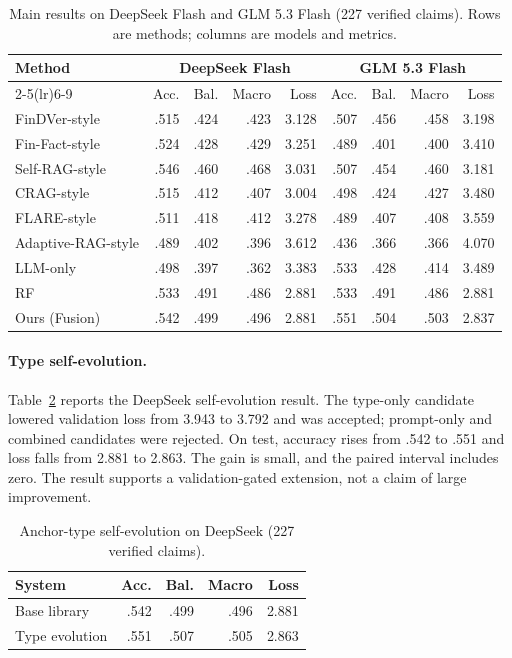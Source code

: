 \documentclass[11pt]{article}
\begin{document}
\begin{table}[t]
\centering
\small
\setlength{\tabcolsep}{6pt}
\caption{Main results on DeepSeek Flash and GLM 5.3 Flash (227 verified claims). Rows are methods; columns are models and metrics.}
\label{tab:main}
\begin{tabular}{lrrrrrrrr}
\toprule
\multirow{2}{*}{Method} & \multicolumn{4}{c}{DeepSeek Flash} & \multicolumn{4}{c}{GLM 5.3 Flash} \\
\cmidrule(lr){2-5}\cmidrule(lr){6-9}
 & Acc. & Bal. & Macro & Loss & Acc. & Bal. & Macro & Loss \\
\midrule
FinDVer-style & .515 & .424 & .423 & 3.128 & .507 & .456 & .458 & 3.198 \\
Fin-Fact-style & .524 & .428 & .429 & 3.251 & .489 & .401 & .400 & 3.410 \\
Self-RAG-style & .546 & .460 & .468 & 3.031 & .507 & .454 & .460 & 3.181 \\
CRAG-style & .515 & .412 & .407 & 3.004 & .498 & .424 & .427 & 3.480 \\
FLARE-style & .511 & .418 & .412 & 3.278 & .489 & .407 & .408 & 3.559 \\
Adaptive-RAG-style & .489 & .402 & .396 & 3.612 & .436 & .366 & .366 & 4.070 \\
\midrule
LLM-only & .498 & .397 & .362 & 3.383 & .533 & .428 & .414 & 3.489 \\
RF & .533 & .491 & .486 & 2.881 & .533 & .491 & .486 & 2.881 \\
Ours (Fusion) & .542 & .499 & .496 & 2.881 & .551 & .504 & .503 & 2.837 \\
\bottomrule
\end{tabular}
\end{table}

\paragraph{Type self-evolution.}
Table~\ref{tab:self} reports the DeepSeek self-evolution result. The type-only candidate lowered validation loss from 3.943 to 3.792 and was accepted; prompt-only and combined candidates were rejected. On test, accuracy rises from .542 to .551 and loss falls from 2.881 to 2.863. The gain is small, and the paired interval includes zero. The result supports a validation-gated extension, not a claim of large improvement.

\begin{table}[t]
\centering
\small
\caption{Anchor-type self-evolution on DeepSeek (227 verified claims).}
\label{tab:self}
\begin{tabular}{lrrrr}
\toprule
System & Acc. & Bal. & Macro & Loss \\
\midrule
Base library & .542 & .499 & .496 & 2.881 \\
Type evolution & .551 & .507 & .505 & 2.863 \\
\bottomrule
\end{tabular}
\end{table}
\end{document}
